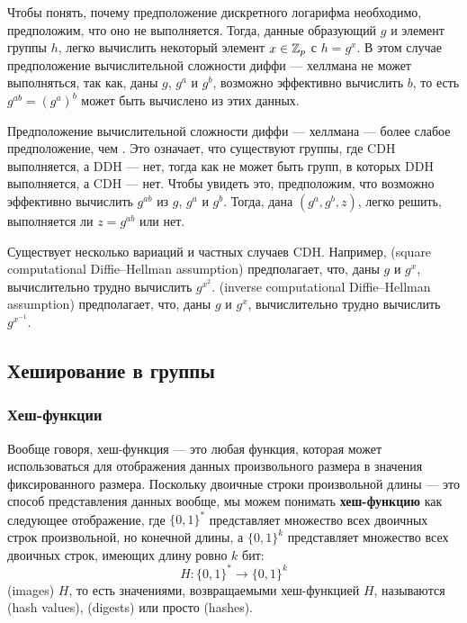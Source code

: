 Чтобы понять, почему предположение дискретного логарифма необходимо, предположим, что оно не выполняется. Тогда, данные образующий $g$ и элемент группы $h$, легко вычислить некоторый элемент $x\in\mathbb{Z}_p$ с $h=g^x$. В этом случае предположение вычислительной сложности диффи — хеллмана не может выполняться, так как, даны $g$, $g^a$ и $g^b$, возможно эффективно вычислить $b$, то есть $g^{ab}=(g^a)^b$ может быть вычислено из этих данных.

Предположение вычислительной сложности диффи — хеллмана — более слабое предположение, чем . Это означает, что существуют группы, где CDH выполняется, а DDH — нет, тогда как не может быть групп, в которых DDH выполняется, а CDH — нет. Чтобы увидеть это, предположим, что возможно эффективно вычислить $g^{ab}$ из $g$, $g^a$ и $g^b$. Тогда, дана $(g^a,g^b,z)$, легко решить, выполняется ли $z=g^{ab}$ или нет.

Существует несколько вариаций и частных случаев CDH. Например,  (square computational Diffie--Hellman assumption) предполагает, что, даны $g$ и $g^x$, вычислительно трудно вычислить $g^{x^2}$.  (inverse computational Diffie--Hellman assumption) предполагает, что, даны $g$ и $g^x$, вычислительно трудно вычислить $g^{x^{-1}}$.

\subsection{Хеширование в группы}\label{sec:hashing-to-groups}
\subsubsection{Хеш-функции}\label{sec:hash-functions} Вообще говоря, хеш-функция — это любая функция, которая может использоваться для отображения данных произвольного размера в значения фиксированного размера. Поскольку двоичные строки произвольной длины — это способ представления данных вообще, мы можем понимать \textbf{хеш-функцию} как следующее отображение, где $\{0,1\}^*$ представляет множество всех двоичных строк произвольной, но конечной длины, а $\{0,1\}^k$ представляет множество всех двоичных строк, имеющих длину ровно $k$ бит:
\begin{equation}
\label{def:hash_function}
H: \{0,1\}^* \to \{0,1\}^k
\end{equation}
 (images) $H$, то есть значениями, возвращаемыми хеш-функцией $H$, называются  (hash values),  (digests) или просто  (hashes).

